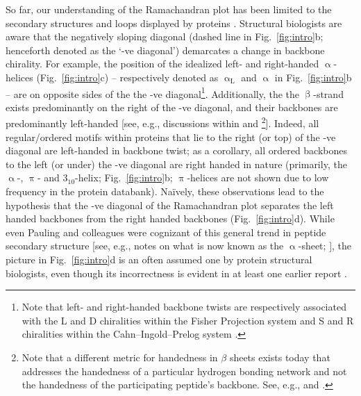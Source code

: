 \documentclass[fleqn,10pt]{wlpeerj} %
\newcommand{\Fig}[1]{Fig.~\ref{#1}}
\begin{document}
So far, our understanding of the Ramachandran plot has been limited to the secondary structures and loops displayed by proteins \citep{Berman2000,Alberts2002}. Structural biologists are aware that the negatively sloping diagonal (dashed line in \Fig{fig:intro}b; henceforth denoted as the `-ve diagonal') demarcates a change in backbone chirality. For example, the position of the idealized left- and right-handed $\upalpha$-helices (\Fig{fig:intro}c) -- respectively denoted as $\upalpha_\textrm{L}$ and $\upalpha$ in \Fig{fig:intro}b -- are on opposite sides of the the -ve diagonal\footnote{Note that left- and right-handed backbone twists are respectively associated with the L and D chiralities within the Fisher Projection system and S and R chiralities within the Cahn--Ingold--Prelog system \citep{Cross2013}.}. Additionally, the the $\upbeta$-strand exists predominantly on the right of the -ve diagonal, and their backbones are predominantly left-handed [see, e.g., discussions within \cite{Quiocho1977} and \cite{Shaw1977}\footnote{Note that a different metric for handedness in $\beta$ sheets exists today that addresses the handedness of a particular hydrogen bonding network and not the handedness of the participating peptide's backbone. See, e.g., \cite{Schulz1974} and \cite{Chothia1977}.}]. Indeed, all regular/ordered motifs within proteins that lie to the right (or top) of the -ve diagonal are left-handed in backbone twist; as a corollary, all ordered backbones to the left (or under) the -ve diagonal are right handed in nature (primarily, the $\upalpha$-, $\uppi$- and $3_{10}$-helix; \Fig{fig:intro}b; $\uppi$-helices are not shown due to low frequency in the protein databank). Na{\"i}vely, these observations lead to the hypothesis that the -ve diagonal of the Ramachandran plot separates the left handed backbones from the right handed backbones (\Fig{fig:intro}d). While even Pauling and colleagues were cognizant of this general trend in peptide secondary structure [see, e.g., notes on what is now known as the $\upalpha$-sheet; \cite{Pauling1951,Pauling1951a,Pauling1951b}], the picture in \Fig{fig:intro}d is an often assumed one by protein structural biologists, even though its incorrectness is evident in at least one earlier report \citep{Zacharias2013}.
\end{document}
